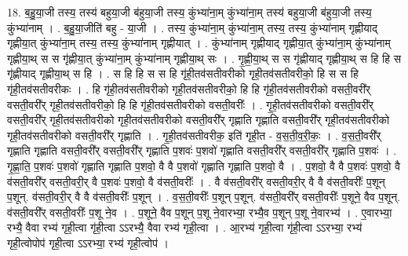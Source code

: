 \documentclass[17pt]{extarticle}
\begin{document}
18. ब॒हु॒या॒जी तस्य॒ तस्य॑ बहुया॒जी ब॑हुया॒जी तस्य॒ कुंभ्या॑ना॒म् कुंभ्या॑ना॒म् तस्य॑ बहुया॒जी ब॑हुया॒जी तस्य॒ कुंभ्या॑नाम् । . ब॒हु॒या॒जीति॑ बहु - या॒जी । . तस्य॒ कुंभ्या॑ना॒म् कुंभ्या॑ना॒म् तस्य॒ तस्य॒ कुंभ्या॑नाम् गृह्णीयाद् गृह्णीया॒त् कुंभ्या॑ना॒म् तस्य॒ तस्य॒ कुंभ्या॑नाम् गृह्णीयात् । . कुंभ्या॑नाम् गृह्णीयाद् गृह्णीया॒त् कुंभ्या॑ना॒म् कुंभ्या॑नाम् गृह्णीया॒थ् स स गृ॑ह्णीया॒त् कुंभ्या॑ना॒म् कुंभ्या॑नाम् गृह्णीया॒थ् सः । . गृ॒ह्णी॒या॒थ् स स गृ॑ह्णीयाद् गृह्णीया॒थ् स हि हि स गृ॑ह्णीयाद् गृह्णीया॒थ् स हि । . स हि हि स स हि गृ॑ही॒तव॑सतीवरीको गृही॒तव॑सतीवरीको॒ हि स स हि गृ॑ही॒तव॑सतीवरीकः । . हि गृ॑ही॒तव॑सतीवरीको गृही॒तव॑सतीवरीको॒ हि हि गृ॑ही॒तव॑सतीवरीको वसती॒वरी᳚र् वसती॒वरी᳚र् गृही॒तव॑सतीवरीको॒ हि हि गृ॑ही॒तव॑सतीवरीको वसती॒वरीः᳚ । . गृ॒ही॒तव॑सतीवरीको वसती॒वरी᳚र् वसती॒वरी᳚र् गृही॒तव॑सतीवरीको गृही॒तव॑सतीवरीको वसती॒वरी᳚र् गृह्णाति गृह्णाति वसती॒वरी᳚र् गृही॒तव॑सतीवरीको गृही॒तव॑सतीवरीको वसती॒वरी᳚र् गृह्णाति । . गृ॒ही॒तव॑सतीवरीक॒ इति॑ गृही॒त - व॒स॒ती॒व॒री॒कः॒ । . व॒स॒ती॒वरी᳚र् गृह्णाति गृह्णाति वसती॒वरी᳚र् वसती॒वरी᳚र् गृह्णाति प॒शवः॑ प॒शवो॑ गृह्णाति वसती॒वरी᳚र् वसती॒वरी᳚र् गृह्णाति प॒शवः॑ । . गृ॒ह्णा॒ति॒ प॒शवः॑ प॒शवो॑ गृह्णाति गृह्णाति प॒शवो॒ वै वै प॒शवो॑ गृह्णाति गृह्णाति प॒शवो॒ वै । . प॒शवो॒ वै वै प॒शवः॑ प॒शवो॒ वै व॑सती॒वरी᳚र् वसती॒वरी॒र् वै प॒शवः॑ प॒शवो॒ वै व॑सती॒वरीः᳚ । . वै व॑सती॒वरी᳚र् वसती॒वरी॒र् वै वै व॑सती॒वरीः᳚ प॒शून् प॒शून्. व॑सती॒वरी॒र् वै वै व॑सती॒वरीः᳚ प॒शून् । . व॒स॒ती॒वरीः᳚ प॒शून् प॒शून्. व॑सती॒वरी᳚र् वसती॒वरीः᳚ प॒शूने॒ वैव प॒शून्. व॑सती॒वरी᳚र् वसती॒वरीः᳚ प॒शू ने॒व । . प॒शूने॒ वैव प॒शून् प॒शू ने॒वारभ्या॒ रभ्यै॒व प॒शून् प॒शू ने॒वारभ्य॑ । . ए॒वारभ्या॒ रभ्यै॒ वैवा रभ्य॑ गृही॒त्वा गृ॑ही॒त्वा ऽऽरभ्यै॒ वैवा रभ्य॑ गृही॒त्वा । . आ॒रभ्य॑ गृही॒त्वा गृ॑ही॒त्वा ऽऽरभ्या॒ रभ्य॑ गृही॒त्वोपोप॑ गृही॒त्वा ऽऽरभ्या॒ रभ्य॑ गृही॒त्वोप॑ । \newline
\end{document}
